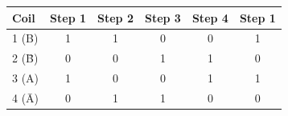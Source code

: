 \needspace{4cm}
\begin{boxedtable}
  \label{tab:exp6-stepseq}
  {\renewcommand{\arraystretch}{1.5}
    \centering
    \begin{tabular}{lccccc}
      \toprule
      Coil    & Step 1 & Step 2 & Step 3 & Step 4 & Step 1 \\
      \midrule
      1 (B)   & 1      & 1      & 0      & 0      & 1      \\
      2 (\=B) & 0      & 0      & 1      & 1      & 0      \\
      3 (A)   & 1      & 0      & 0      & 1      & 1      \\
      4 (\=A) & 0      & 1      & 1      & 0      & 0      \\
      \bottomrule
    \end{tabular}
  }
\end{boxedtable}

